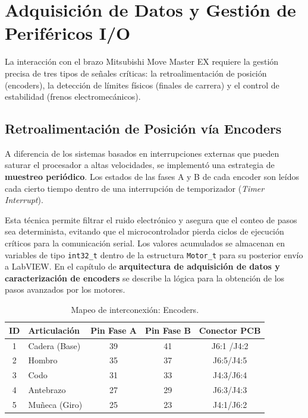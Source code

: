 \section{Adquisición de Datos y Gestión de Periféricos I/O}
La interacción con el brazo Mitsubishi Move Master EX requiere la gestión precisa de tres tipos de señales críticas: la retroalimentación de posición (encoders), la detección de límites físicos (finales de carrera) y el control de estabilidad (frenos electromecánicos).

\subsection{Retroalimentación de Posición vía Encoders}
A diferencia de los sistemas basados en interrupciones externas que pueden saturar el procesador a altas velocidades, se implementó una estrategia de \textbf{muestreo periódico}. Los estados de las fases A y B de cada encoder son leídos cada cierto tiempo dentro de una interrupción de temporizador (\textit{Timer Interrupt}). 

Esta técnica permite filtrar el ruido electrónico y asegura que el conteo de pasos sea determinista, evitando que el microcontrolador pierda ciclos de ejecución críticos para la comunicación serial. Los valores acumulados se almacenan en variables de tipo \texttt{int32\_t} dentro de la estructura \texttt{Motor\_t} para su posterior envío a LabVIEW. En el capítulo de \textbf{arquitectura de adquisición de datos y caracterización de encoders} se describe la lógica para la obtención de los pasos avanzados por los motores.
\begin{table}[h!]
	\centering
	\renewcommand{\arraystretch}{1.5}
	\caption{Mapeo de interconexión: Encoders.}
	\label{tab:interconexion_maestra}
	\begin{tabularx}{\textwidth}{|c|l|c|c|c|}
		\hline
		\rowcolor{green!20}
		\textbf{ID} & \textbf{Articulación} & \textbf{Pin Fase A} & \textbf{Pin Fase B} & \textbf{Conector PCB}  \\ \hline
		1 & Cadera (Base) & 39 & 41 & J6:1 /J4:2 \\ \hline
		2 & Hombro        & 35 & 37 & J6:5/J4:5  \\ \hline
		3 & Codo          & 31 & 33 & J4:3/J6:4  \\ \hline
		4 & Antebrazo     & 27 & 29 & J6:3/J4:3  \\ \hline
		5 & Muñeca (Giro) & 25 & 23 & J4:1/J6:2  \\ \hline
	\end{tabularx}
\end{table}



